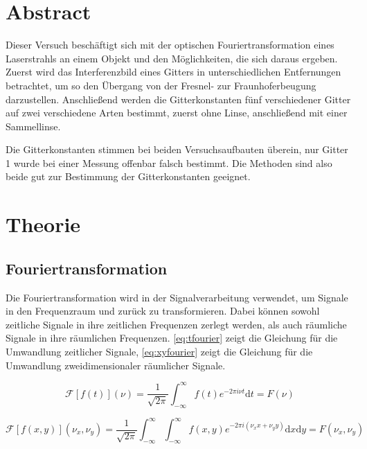 \section{Abstract}
Dieser Versuch beschäftigt sich mit der optischen Fouriertransformation eines Laserstrahls an einem Objekt und den Möglichkeiten, die sich daraus ergeben. Zuerst wird das Interferenzbild eines Gitters in unterschiedlichen Entfernungen betrachtet, um so den Übergang von der Fresnel- zur Fraunhoferbeugung darzustellen. Anschließend werden die Gitterkonstanten fünf verschiedener Gitter auf zwei verschiedene Arten bestimmt, zuerst ohne Linse, anschließend mit einer Sammellinse.

Die Gitterkonstanten stimmen bei beiden Versuchsaufbauten überein, nur Gitter 1 wurde bei einer Messung offenbar falsch bestimmt. Die Methoden sind also beide gut zur Bestimmung der Gitterkonstanten geeignet.



\section{Theorie\cite{anleitung-ws2014}}
\subsection{Fouriertransformation}
Die Fouriertransformation wird in der Signalverarbeitung verwendet, um Signale in den Frequenzraum und zurück zu transformieren. Dabei können sowohl zeitliche Signale in ihre zeitlichen Frequenzen zerlegt werden, als auch räumliche Signale in ihre räumlichen Frequenzen. \cref{eq:tfourier} zeigt die Gleichung für die Umwandlung zeitlicher Signale, \cref{eq:xyfourier} zeigt die Gleichung für die Umwandlung zweidimensionaler räumlicher Signale.

\begin{equation}
	\mathcal{F}\left[ f\left( t\right) \right] \left( \nu\right) = \frac{1}{\sqrt{2\pi}} \int_{-\infty}^{\infty} f\left( t\right) e^{-2\pi i \nu t} \text{d}t = F\left( \nu\right) 
	\label{eq:tfourier}
\end{equation}

\begin{equation}
	\mathcal{F}\left[ f\left( x,y\right) \right] \left( \nu_x, \nu_y\right) = \frac{1}{\sqrt{2\pi}} \int_{-\infty}^{\infty} \int_{-\infty}^{\infty} f\left( x, y\right) e^{-2\pi i (\nu_x x + \nu_y y)} \text{d}x \text{d}y = F\left( \nu_x, \nu_y\right) 
	\label{eq:xyfourier}
\end{equation}

